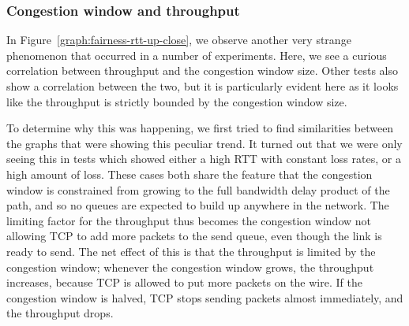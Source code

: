 \subsubsection{Congestion window and throughput}

In Figure~\ref{graph:fairness-rtt-up-close}, we observe another very strange
phenomenon that occurred in a number of experiments. Here, we see a curious
correlation between throughput and the congestion window size. Other tests also
show a correlation between the two, but it is particularly evident here as it 
looks like the throughput is strictly bounded by the congestion window size.

To determine why this was happening, we first tried to find similarities
between the graphs that were showing this peculiar trend. It turned out that we
were only seeing this in tests which showed either a high RTT with constant loss
rates, or a high amount of loss. These cases both share the feature that the
congestion window is constrained from growing to the full bandwidth delay
product of the path, and so no queues are expected to build up anywhere in the
network. The limiting factor for the throughput thus becomes the congestion window not
allowing TCP to add more packets to the send queue, even though the link is
ready to send. The net effect of this is that the throughput is limited by the
congestion window; whenever the congestion window grows, the throughput
increases, because TCP is allowed to put more packets on the wire. If the
congestion window is halved, TCP stops sending packets almost immediately, and
the throughput drops.
